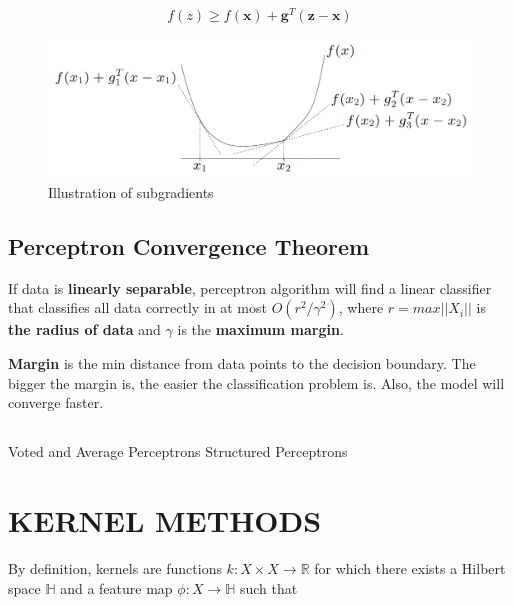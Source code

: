 \documentclass[8pt,letterpaper]{book}
\begin{document}
$$f(z) \geq f(\mathbf{x}) + \mathbf{g}^T (\mathbf{z - x})$$

\begin{figure}[H]
    \centering
    \includegraphics[scale=0.5]{subgradients.png} \par
    \caption{Illustration of subgradients}
    \label{subgradient_illustration}
\end{figure}

\section{Perceptron Convergence Theorem}
If data is \textbf{linearly separable}, perceptron algorithm will find a linear 
classifier that classifies all data correctly in at most $O(r^2 / \gamma^2)$, 
where $r = max||X_i||$ is \textbf{the radius of data} and $\gamma$ is the 
\textbf{maximum margin}.

\textbf{Margin} is the min distance from data points to the decision boundary. 
The bigger the margin is, the easier the classification problem is. Also, the 
model will converge faster.

\section{}
\section{}



Voted and Average Perceptrons
Structured Perceptrons



\chapter{KERNEL METHODS}
By definition, kernels are functions 
$k : X \times X \rightarrow \mathbb{R}$ for which there exists a Hilbert space 
$\mathbb{H}$ and a feature map $\phi : X \rightarrow \mathbb{H}$ such that
\end{document}
